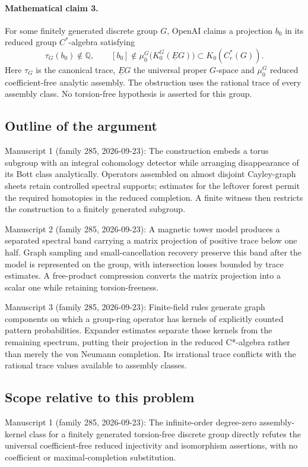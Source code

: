\documentclass[11pt]{article}
\begin{document}
\paragraph{Mathematical claim 3.} For some finitely generated discrete group $G$, OpenAI claims a projection $b_0$ in its reduced group $C^*$-algebra satisfying
\[
\tau_G(b_0)\notin\mathbb Q,\qquad
[b_0]\notin\mu_0^G\bigl(K_0^G(\underline EG)\bigr)\subset K_0(C_r^*(G)).
\]
Here $\tau_G$ is the canonical trace, $\underline EG$ the universal proper $G$-space and $\mu_0^G$ reduced coefficient-free analytic assembly. The obstruction uses the rational trace of every assembly class. No torsion-free hypothesis is asserted for this group.

\subsection{Outline of the argument}
Manuscript 1 (family 285, 2026-09-23): The construction embeds a torus subgroup with an integral cohomology detector while arranging disappearance of its Bott class analytically. Operators assembled on almost disjoint Cayley-graph sheets retain controlled spectral supports; estimates for the leftover forest permit the required homotopies in the reduced completion. A finite witness then restricts the construction to a finitely generated subgroup.

Manuscript 2 (family 285, 2026-09-23): A magnetic tower model produces a separated spectral band carrying a matrix projection of positive trace below one half. Graph sampling and small-cancellation recovery preserve this band after the model is represented on the group, with intersection losses bounded by trace estimates. A free-product compression converts the matrix projection into a scalar one while retaining torsion-freeness.

Manuscript 3 (family 285, 2026-09-23): Finite-field rules generate graph components on which a group-ring operator has kernels of explicitly counted pattern probabilities. Expander estimates separate those kernels from the remaining spectrum, putting their projection in the reduced C*-algebra rather than merely the von Neumann completion. Its irrational trace conflicts with the rational trace values available to assembly classes.

\subsection{Scope relative to this problem}
Manuscript 1 (family 285, 2026-09-23): The infinite-order degree-zero assembly-kernel class for a finitely generated torsion-free discrete group directly refutes the universal coefficient-free reduced injectivity and isomorphism assertions, with no coefficient or maximal-completion substitution.
\end{document}
